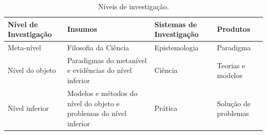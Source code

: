 \documentclass[
	12pt,				%
	openright,			%
	oneside,			%
	a4paper,			%
	chapter=TITLE,		%
	english,			%
	french,				%
	spanish,			%
	brazil				%
	]{abntex2}
\begin{document}
{{\begin{table}[htb]
\ABNTEXfontereduzida
\caption[Níveis de investigação]{Níveis de investigação.}
\label{tab-nivinv}
\begin{tabular}{p{2.6cm}|p{6.0cm}|p{2.25cm}|p{3.40cm}}
   \textbf{Nível de Investigação} & \textbf{Insumos}  & \textbf{Sistemas de Investigação}  & \textbf{Produtos}  \\
    \hline
    Meta-nível & Filosofia\index{filosofia} da Ciência  & Epistemologia &
    Paradigma  \\
    \hline
    Nível do objeto & Paradigmas do metanível e evidências do nível inferior &
    Ciência  & Teorias e modelos \\
    \hline
    Nível inferior & Modelos e métodos do nível do objeto e problemas do nível inferior & Prática & Solução de problemas  \\
\end{tabular}
\end{table}



\postextual

%

%
%


\begin{apendicesenv}

\partapendices


\end{apendicesenv}}}
\end{document}
